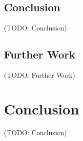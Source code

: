\documentclass[a4paper,twoside]{article}
\newcommand{\TODO}[1]{\textcolor{YellowOrange}{(TODO: #1)}} %
\begin{document}
\subsection{Conclusion}

\TODO{Conclusion}

\subsection{Further Work}

\TODO{Further Work}

\clearpage
\section{Conclusion}
\label{conclusion}

\TODO{Conclusion}

\appendix

\clearpage

\nocite{*}


\end{document}
